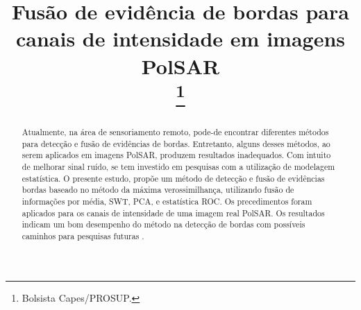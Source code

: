 \documentclass[conference]{IEEEtran}
\begin{document}
\title{Fusão de evidência de bordas para canais de intensidade em imagens PolSAR\\
\thanks{Bolsista Capes/PROSUP.}
}

\author{
\and
{}
\and
{}
}

\maketitle

\begin{abstract}
Atualmente, na área de sensoriamento remoto, pode-de encontrar diferentes métodos para detecção e fusão de evidências de bordas. Entretanto, alguns desses  métodos, ao serem aplicados em imagens PolSAR, produzem resultados inadequados. Com intuito de melhorar sinal ruído, se tem investido em pesquisas com a utilização de modelagem estatística. O presente estudo, propõe um método de detecção e fusão de evidências bordas baseado no método da máxima verossimilhança, utilizando fusão de informações por média, SWT, PCA, e estatística ROC. Os precedimentos foram aplicados para os canais de intensidade de uma imagem real PolSAR. Os resultados indicam um bom desempenho do método na detecção de bordas com possíveis caminhos para pesquisas futuras .
\end{abstract}
\end{document}
